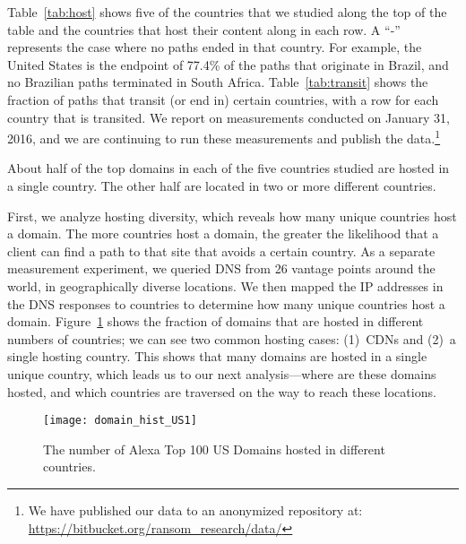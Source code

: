 

Table~\ref{tab:host} shows five of the countries that we studied along the top
of the table and the countries that host their content along in each row.  A
``-'' represents the case where no paths ended in that country. For example,
the United States is the endpoint of 77.4\% of the paths that originate in
Brazil, and no Brazilian paths terminated in South Africa.
Table~\ref{tab:transit} shows the fraction of paths that transit (or end in)
certain countries, with a row for each country that is transited.  We report 
on measurements conducted on January 31, 2016, and we are continuing to run 
these measurements and publish the data.\footnote{We have published our data 
to an anonymized repository at: \url{https://bitbucket.org/ransom_research/data/}}

\begin{finding} About half of the top domains in each of
the five countries studied are hosted in a single country.  The other half are
located in two or more different countries. \end{finding} 

\noindent First, we analyze hosting diversity, which reveals how many unique
countries host a domain.  The more countries host a domain, the greater the
likelihood that a client can find a path to that site that avoids a certain
country. As a separate measurement experiment, we queried DNS from 26 vantage points around the world, in
geographically diverse locations. We then mapped the IP addresses in the DNS
responses to countries to determine how many unique countries host a domain.
Figure~\ref{fig:host_diversity} shows the fraction of domains that are hosted
in different numbers of countries; we can see two common hosting cases:
(1)~CDNs and (2)~a single hosting country.  This shows that many domains are
hosted in a single unique country, which leads us to our next analysis---where
are these domains hosted, and which countries are traversed on the way to
reach these locations.


\begin{figure}[t]
\centering
\texttt{[image: domain\_hist\_US1]}
\caption{The number of Alexa Top 100 US Domains hosted in different countries.}
\label{fig:host_diversity}
\end{figure}


